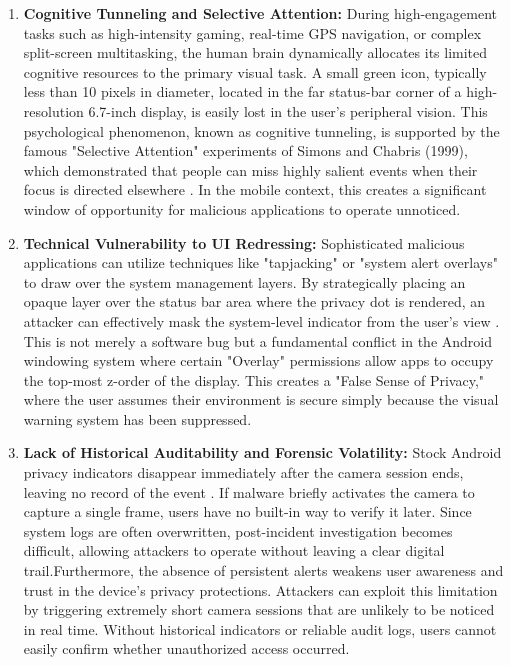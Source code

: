 \documentclass[12pt,a4paper]{report}
\begin{document}
\begin{enumerate}
        Furthermore, the passive notification model lacks the "Interruptive Salience" necessary to break a user's flow. Unlike a haptic buzz or a sound alert, the dot is a silent, non-moving signal. In the context of a high-resolution 1440p mobile display, a 10-pixel icon occupies less than $0.001\%$ of the total screen acreage. If a user is focused on a complex task like editing a document or navigating traffic via a GPS app, the probability of them noticing a change in that $0.01\%$ area within the first 10 seconds of activation is statistically low. This "Visibility Trap" provides malware with a predictable window of invisibility during the most critical moments of the user's interaction cycle.
        \item \textbf{Cognitive Tunneling and Selective Attention:} During high-engagement tasks such as high-intensity gaming, real-time GPS navigation, or complex split-screen multitasking, the human brain dynamically allocates its limited cognitive resources to the primary visual task. A small green icon, typically less than 10 pixels in diameter, located in the far status-bar corner of a high-resolution 6.7-inch display, is easily lost in the user's peripheral vision. This psychological phenomenon, known as cognitive tunneling, is supported by the famous "Selective Attention" experiments of Simons and Chabris (1999), which demonstrated that people can miss highly salient events when their focus is directed elsewhere \cite{contextaware}. In the mobile context, this creates a significant window of opportunity for malicious applications to operate unnoticed.
        \item \textbf{Technical Vulnerability to UI Redressing:} Sophisticated malicious applications can utilize techniques like "tapjacking" or "system alert overlays" to draw over the system management layers. By strategically placing an opaque layer over the status bar area where the privacy dot is rendered, an attacker can effectively mask the system-level indicator from the user's view \cite{checkmarx}. This is not merely a software bug but a fundamental conflict in the Android windowing system where certain "Overlay" permissions allow apps to occupy the top-most z-order of the display. This creates a "False Sense of Privacy," where the user assumes their environment is secure simply because the visual warning system has been suppressed.
        \item \textbf{Lack of Historical Auditability and Forensic Volatility:} Stock Android privacy indicators disappear immediately after the camera session ends, leaving no record of the event \cite{smarthome}. If malware briefly activates the camera to capture a single frame, users have no built-in way to verify it later. Since system logs are often overwritten, post-incident investigation becomes difficult, allowing attackers to operate without leaving a clear digital trail.Furthermore, the absence of persistent alerts weakens user awareness and trust in the device’s privacy protections. Attackers can exploit this limitation by triggering extremely short camera sessions that are unlikely to be noticed in real time. Without historical indicators or reliable audit logs, users cannot easily confirm whether unauthorized access occurred.


\end{enumerate}
\end{document}

